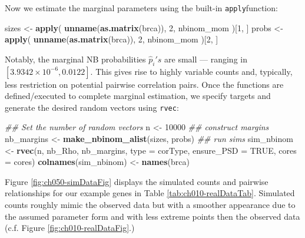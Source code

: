 \documentclass[]{article}
\newenvironment{Shaded}{\begin{snugshade}}{\end{snugshade}}
\newcommand{\CommentTok}[1]{\textcolor[rgb]{0.56,0.35,0.01}{\textit{#1}}}
\newcommand{\DataTypeTok}[1]{\textcolor[rgb]{0.13,0.29,0.53}{#1}}
\newcommand{\DecValTok}[1]{\textcolor[rgb]{0.00,0.00,0.81}{#1}}
\newcommand{\KeywordTok}[1]{\textcolor[rgb]{0.13,0.29,0.53}{\textbf{#1}}}
\newcommand{\NormalTok}[1]{#1}
\newcommand{\OtherTok}[1]{\textcolor[rgb]{0.56,0.35,0.01}{#1}}
\newcommand{\StringTok}[1]{\textcolor[rgb]{0.31,0.60,0.02}{#1}}
\begin{document}
Now we estimate the marginal parameters using the built-in \texttt{apply}function:

\begin{Shaded}
\begin{Highlighting}[]
\NormalTok{sizes <-}\StringTok{ }\KeywordTok{apply}\NormalTok{( }\KeywordTok{unname}\NormalTok{(}\KeywordTok{as.matrix}\NormalTok{(brca)), }\DecValTok{2}\NormalTok{, nbinom_mom )[}\DecValTok{1}\NormalTok{, ]}
\NormalTok{probs <-}\StringTok{ }\KeywordTok{apply}\NormalTok{( }\KeywordTok{unname}\NormalTok{(}\KeywordTok{as.matrix}\NormalTok{(brca)), }\DecValTok{2}\NormalTok{, nbinom_mom )[}\DecValTok{2}\NormalTok{, ]}
\end{Highlighting}
\end{Shaded}

Notably, the marginal NB probabilities \(\hat{p}_i's\) are small --- ranging in \([\ensuremath{3.9342\times 10^{-6}} , 0.0122]\).
This gives rise to highly variable counts and, typically, less restriction on potential pairwise correlation pairs.
Once the functions are defined/executed to complete marginal estimation, we specify targets and generate the desired random vectors using \texttt{rvec}:

\begin{Shaded}
\begin{Highlighting}[]
\CommentTok{## Set the number of random vectors}
\NormalTok{n <-}\StringTok{ }\DecValTok{10000}
\CommentTok{## construct margins}
\NormalTok{nb_margins <-}\StringTok{ }\KeywordTok{make_nbinom_alist}\NormalTok{(sizes, probs)}
\CommentTok{## run sims}
\NormalTok{sim_nbinom <-}\StringTok{ }\KeywordTok{rvec}\NormalTok{(n, nb_Rho, nb_margins, }\DataTypeTok{type =}\NormalTok{ corType,}
                   \DataTypeTok{ensure_PSD =} \OtherTok{TRUE}\NormalTok{, }\DataTypeTok{cores =}\NormalTok{ cores) }
\KeywordTok{colnames}\NormalTok{(sim_nbinom) <-}\StringTok{ }\KeywordTok{names}\NormalTok{(brca)}
\end{Highlighting}
\end{Shaded}

Figure \ref{fig:ch050-simDataFig} displays the simulated counts and pairwise relationships for our example genes in Table \ref{tab:ch010-realDataTab}.
Simulated counts roughly mimic the observed data but with a smoother appearance due to the assumed parameter form and with less extreme points then the observed data (c.f. Figure \ref{fig:ch010-realDataFig}.)
\end{document}
